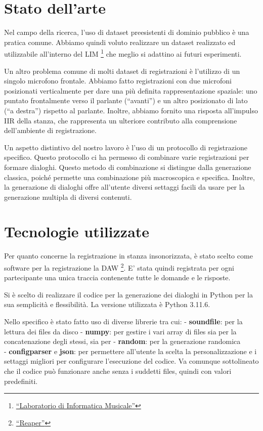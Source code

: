 \documentclass[
]{article}
\begin{document}
\section{Stato dell'arte}\label{stato-dellarte}

Nel campo della ricerca, l'uso di dataset preesistenti di dominio pubblico è una pratica comune. Abbiamo quindi voluto realizzare un dataset realizzato ed utilizzabile all'interno del LIM \footnote{\href{https://www.lim.di.unimi.it/}{``Laboratorio di Informatica Musicale''}} che meglio si adattino ai futuri esperimenti.

Un altro problema comune di molti dataset di registrazioni è l'utilizzo di un singolo microfono frontale. Abbiamo fatto registrazioni con due microfoni posizionati verticalmente per dare una più definita rappresentazione spaziale: uno puntato frontalmente verso il parlante (``avanti'') e un altro posizionato di lato (``a destra'') rispetto al parlante. Inoltre, abbiamo fornito una risposta all'impulso IIR della stanza, che rappresenta un ulteriore contributo alla comprensione dell'ambiente di registrazione.

Un aspetto distintivo del nostro lavoro è l'uso di un protocollo di registrazione specifico. Questo protocollo ci ha permesso di combinare varie registrazioni per formare dialoghi. Questo metodo di combinazione si distingue dalla generazione classica, poiché permette una combinazione più macroscopica e specifica. Inoltre, la generazione di dialoghi offre all'utente diversi settaggi facili da usare per la generazione multipla di diversi contenuti.

\section{Tecnologie utilizzate}\label{tecnologie-utilizzate}

Per quanto concerne la registrazione in stanza insonorizzata, è stato scelto come software per la registrazione la DAW \footnote{\href{https://www.reaper.fm/}{``Reaper''}}. E' stata quindi registrata per ogni partecipante una unica traccia contenente tutte le domande e le risposte.

Si è scelto di realizzare il codice per la generazione dei dialoghi in Python per la sua semplicità e flessibilità. La versione utilizzata è Python 3.11.6.

Nello specifico è stato fatto uso di diverse librerie tra cui: - \textbf{soundfile}: per la lettura dei files da disco - \textbf{numpy}: per gestire i vari array di files sia per la concatenazione degli stessi, sia per - \textbf{random}: per la generazione randomica\\
- \textbf{configparser} e \textbf{json}: per permettere all'utente la scelta la personalizzazione e i settaggi migliori per configurare l'esecuzione del codice. Va comunque sottolineato che il codice può funzionare anche senza i suddetti files, quindi con valori predefiniti.
\end{document}
